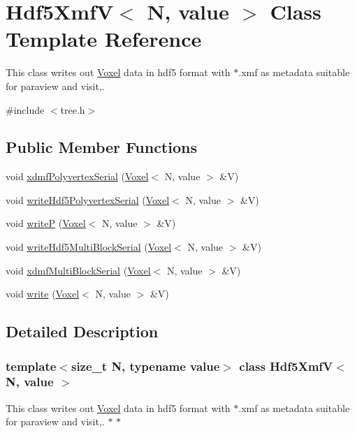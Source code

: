 \hypertarget{classHdf5XmfV}{
\section{Hdf5XmfV$<$ N, value $>$ Class Template Reference}
\label{classHdf5XmfV}
}


This class writes out \hyperlink{classVoxel}{Voxel} data in hdf5 format with $\ast$.xmf as metadata suitable for paraview and visit,.  


{\ttfamily \#include $<$tree.h$>$}\subsection*{Public Member Functions}
\begin{DoxyCompactItemize}
\item 
void \hyperlink{classHdf5XmfV_aa628576f1c167b9ae740b35fe820ccb9}{xdmfPolyvertexSerial} (\hyperlink{classVoxel}{Voxel}$<$ N, value $>$ \&V)
\item 
void \hyperlink{classHdf5XmfV_acbfe982bd279b8b319192599ff5a2dbe}{writeHdf5PolyvertexSerial} (\hyperlink{classVoxel}{Voxel}$<$ N, value $>$ \&V)
\item 
void \hyperlink{classHdf5XmfV_a59e1e8befe19492a44253a6e2a88dbf4}{writeP} (\hyperlink{classVoxel}{Voxel}$<$ N, value $>$ \&V)
\item 
void \hyperlink{classHdf5XmfV_ac0518586e7645121c0cd0b1fbf1cedda}{writeHdf5MultiBlockSerial} (\hyperlink{classVoxel}{Voxel}$<$ N, value $>$ \&V)
\item 
void \hyperlink{classHdf5XmfV_a303a20a8b00db8f318e86e3619d8d206}{xdmfMultiBlockSerial} (\hyperlink{classVoxel}{Voxel}$<$ N, value $>$ \&V)
\item 
void \hyperlink{classHdf5XmfV_a1b5ca0189c327d3080da1de92a99047f}{write} (\hyperlink{classVoxel}{Voxel}$<$ N, value $>$ \&V)
\end{DoxyCompactItemize}


\subsection{Detailed Description}
\subsubsection*{template$<$size\_\-t N, typename value$>$ class Hdf5XmfV$<$ N, value $>$}

This class writes out \hyperlink{classVoxel}{Voxel} data in hdf5 format with $\ast$.xmf as metadata suitable for paraview and visit,. $\ast$ $\ast$

